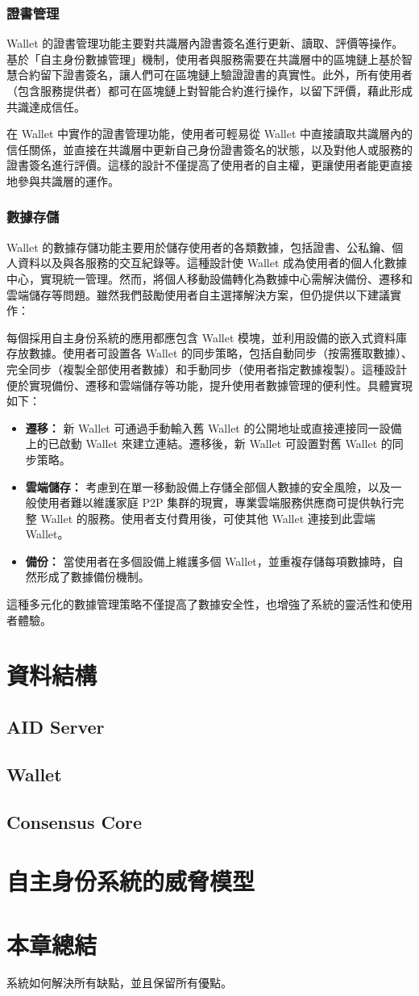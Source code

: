 \subsubsection{證書管理}
Wallet 的證書管理功能主要對共識層內證書簽名進行更新、讀取、評價等操作。基於「自主身份數據管理」機制，使用者與服務需要在共識層中的區塊鏈上基於智慧合約留下證書簽名，讓人們可在區塊鏈上驗證證書的真實性。此外，所有使用者（包含服務提供者）都可在區塊鏈上對智能合約進行操作，以留下評價，藉此形成共識達成信任。

在 Wallet 中實作的證書管理功能，使用者可輕易從 Wallet 中直接讀取共識層內的信任關係，並直接在共識層中更新自己身份證書簽名的狀態，以及對他人或服務的證書簽名進行評價。這樣的設計不僅提高了使用者的自主權，更讓使用者能更直接地參與共識層的運作。
\subsubsection{數據存儲}
Wallet 的數據存儲功能主要用於儲存使用者的各類數據，包括證書、公私鑰、個人資料以及與各服務的交互紀錄等。這種設計使 Wallet 成為使用者的個人化數據中心，實現統一管理。然而，將個人移動設備轉化為數據中心需解決備份、遷移和雲端儲存等問題。雖然我們鼓勵使用者自主選擇解決方案，但仍提供以下建議實作：

每個採用自主身份系統的應用都應包含 Wallet 模塊，並利用設備的嵌入式資料庫存放數據。使用者可設置各 Wallet 的同步策略，包括自動同步（按需獲取數據）、完全同步（複製全部使用者數據）和手動同步（使用者指定數據複製）。這種設計便於實現備份、遷移和雲端儲存等功能，提升使用者數據管理的便利性。具體實現如下：
\begin{itemize}
  \item \textbf{遷移：} 新 Wallet 可通過手動輸入舊 Wallet 的公開地址或直接連接同一設備上的已啟動 Wallet 來建立連結。遷移後，新 Wallet 可設置對舊 Wallet 的同步策略。
  \item \textbf{雲端儲存：} 考慮到在單一移動設備上存儲全部個人數據的安全風險，以及一般使用者難以維護家庭 P2P 集群的現實，專業雲端服務供應商可提供執行完整 Wallet 的服務。使用者支付費用後，可使其他 Wallet 連接到此雲端 Wallet。
  \item \textbf{備份：} 當使用者在多個設備上維護多個 Wallet，並重複存儲每項數據時，自然形成了數據備份機制。
\end{itemize}
這種多元化的數據管理策略不僅提高了數據安全性，也增強了系統的靈活性和使用者體驗。
\section{資料結構}
\subsection{AID Server}
\subsection{Wallet}
\subsection{Consensus Core}
\section{自主身份系統的威脅模型}
\section{本章總結}
系統如何解決所有缺點，並且保留所有優點。

